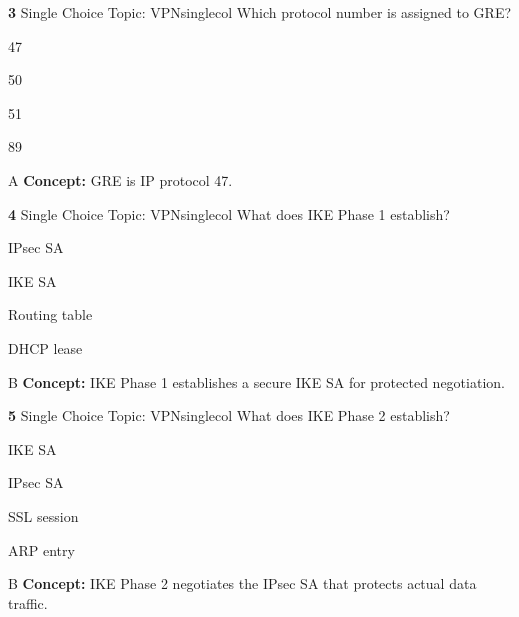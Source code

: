 \documentclass[10pt,a4paper]{article}
\begin{document}
\begin{qcard}{\color{white}\textbf{3} \hfill \small Single Choice \textbar{} Topic: VPN}{singlecol}
Which protocol number is assigned to GRE?

\begin{qoptions}
\item 47
\item 50
\item 51
\item 89
\end{qoptions}
\begin{explainbox}{A}
\textbf{Concept:} GRE is IP protocol 47.
\end{explainbox}
\end{qcard}

\begin{qcard}{\color{white}\textbf{4} \hfill \small Single Choice \textbar{} Topic: VPN}{singlecol}
What does IKE Phase 1 establish?

\begin{qoptions}
\item IPsec SA
\item IKE SA
\item Routing table
\item DHCP lease
\end{qoptions}
\begin{explainbox}{B}
\textbf{Concept:} IKE Phase 1 establishes a secure IKE SA for protected negotiation.
\end{explainbox}
\end{qcard}

\begin{qcard}{\color{white}\textbf{5} \hfill \small Single Choice \textbar{} Topic: VPN}{singlecol}
What does IKE Phase 2 establish?

\begin{qoptions}
\item IKE SA
\item IPsec SA
\item SSL session
\item ARP entry
\end{qoptions}
\begin{explainbox}{B}
\textbf{Concept:} IKE Phase 2 negotiates the IPsec SA that protects actual data traffic.
\end{explainbox}
\end{qcard}
\end{document}
